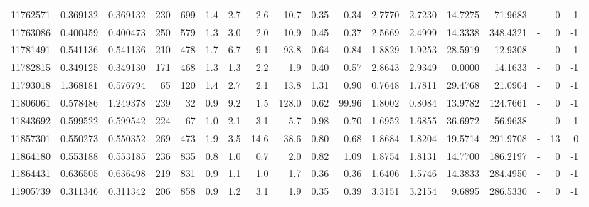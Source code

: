\begin{tabular}{rrrrrrrrrrrrrrrlrr}
  11762571 & 0.369132 &   0.369132 &  230 &  699 &      1.4 &      2.7 &     2.6 &     10.7 &       0.35 &        0.34 &  2.7770 &  2.7230 &   14.7275 &   71.9683 &             - &        0 &         -1 \\
  11763086 & 0.400459 &   0.400473 &  250 &  579 &      1.3 &      3.0 &     2.0 &     10.9 &       0.45 &        0.37 &  2.5669 &  2.4999 &   14.3338 &  348.4321 &             - &        0 &         -1 \\
  11781491 & 0.541136 &   0.541136 &  210 &  478 &      1.7 &      6.7 &     9.1 &     93.8 &       0.64 &        0.84 &  1.8829 &  1.9253 &   28.5919 &   12.9308 &             - &        0 &         -1 \\
  11782815 & 0.349125 &   0.349130 &  171 &  468 &      1.3 &      1.3 &     2.2 &      1.9 &       0.40 &        0.57 &  2.8643 &  2.9349 &    0.0000 &   14.1633 &             - &        0 &         -1 \\
  11793018 & 1.368181 &   0.576794 &   65 &  120 &      1.4 &      2.7 &     2.1 &     13.8 &       1.31 &        0.90 &  0.7648 &  1.7811 &   29.4768 &   21.0904 &             - &        0 &         -1 \\
  11806061 & 0.578486 &   1.249378 &  239 &   32 &      0.9 &      9.2 &     1.5 &    128.0 &       0.62 &       99.96 &  1.8002 &  0.8084 &   13.9782 &  124.7661 &             - &        0 &         -1 \\
  11843692 & 0.599522 &   0.599542 &  224 &   67 &      1.0 &      2.1 &     3.1 &      5.7 &       0.98 &        0.70 &  1.6952 &  1.6855 &   36.6972 &   56.9638 &             - &        0 &         -1 \\
  11857301 & 0.550273 &   0.550352 &  269 &  473 &      1.9 &      3.5 &    14.6 &     38.6 &       0.80 &        0.68 &  1.8684 &  1.8204 &   19.5714 &  291.9708 &             - &       13 &          0 \\
  11864180 & 0.553188 &   0.553185 &  236 &  835 &      0.8 &      1.0 &     0.7 &      2.0 &       0.82 &        1.09 &  1.8754 &  1.8131 &   14.7700 &  186.2197 &             - &        0 &         -1 \\
  11864431 & 0.636505 &   0.636498 &  219 &  831 &      0.9 &      1.1 &     1.0 &      1.7 &       0.36 &        0.36 &  1.6406 &  1.5746 &   14.3833 &  284.4950 &             - &        0 &         -1 \\
  11905739 & 0.311346 &   0.311342 &  206 &  858 &      0.9 &      1.2 &     3.1 &      1.9 &       0.35 &        0.39 &  3.3151 &  3.2154 &    9.6895 &  286.5330 &             - &        0 &         -1 \\

\end{tabular}
